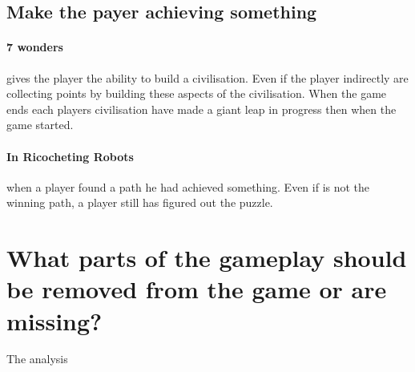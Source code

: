 \documentclass[a4paper]{article}
\begin{document}
\subsection{Make the payer achieving something}
\paragraph{7 wonders} gives the player the ability to build a civilisation. Even if the player indirectly are collecting points by building these aspects of the civilisation. When the game ends each players civilisation have made a giant leap in progress then when the game started. 

\paragraph{In Ricocheting Robots} when a player found a path he had achieved something. Even if is not the winning path, a player still has figured out the puzzle.

\section{What parts of the gameplay should be removed from the game or are missing?}
The analysis 


\newpage


\end{document}
